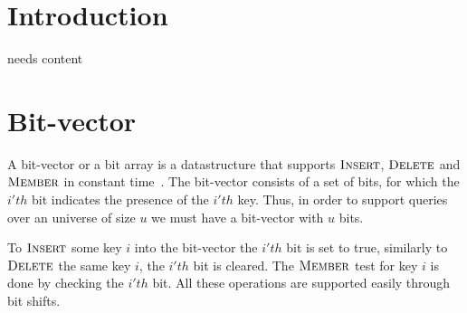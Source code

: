 \documentclass[oneside,11pt,openright]{report}
\newcommand{\Insert}{\textsc{Insert}}
\newcommand{\Delete}{\textsc{Delete}}
\newcommand{\Member}{\textsc{Member}}
\begin{document}

\pagestyle{empty} 
\vspace*{\fill}
\clearpage


\tableofcontents
{}
\setcounter{secnumdepth}{2}


\chapter{Introduction}

needs content

\chapter{Bit-vector}

A bit-vector or a bit array is a datastructure that supports
$\Insert$, $\Delete$ and $\Member$ in constant
time~\cite[p. 532]{ITA09}. The bit-vector consists of a set of bits,
for which the $i'th$ bit indicates the presence of the
$i'th$ key. Thus, in order to support queries over an universe of size $u$ we must
have a bit-vector with $u$ bits.

To $\Insert$ some key $i$ into the bit-vector the $i'th$ bit is set to
true, similarly to $\Delete$ the same key $i$, the $i'th$ bit is
cleared. The $\Member$ test for key $i$ is done by checking the $i'th$
bit. All these operations are supported easily through bit
shifts. 
\end{document}
